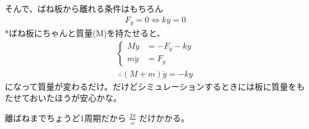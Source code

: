 \documentclass[a4paper,11pt]{jsarticle}
\begin{document}
そんで、ばね板から離れる条件はもちろん
\begin{align}
  F_y = 0 \Leftrightarrow ky = 0
\end{align}
*ばね板にちゃんと質量(M)を持たせると、
\begin{align}
  \begin{cases}
    M\ddot{y} &= -F_y - ky
    \\ m\ddot{y} &= F_y
  \end{cases}
\end{align}
\begin{align}
  \therefore (M + m)\ddot{y} = - ky
\end{align}
になって質量が変わるだけ。だけどシミュレーションするときには板に質量をもたせておいたほうが安心かな。

離ばねまでちょうど1周期だから
$\frac{2\pi}{\omega}$
だけかかる。
\end{document}
